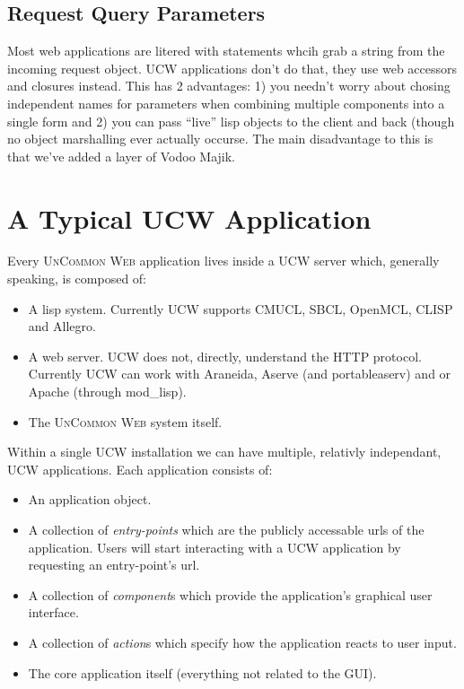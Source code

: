 \documentclass[a4paper]{article}
\newcommand{\ucw}{\textsc{UCW}}
\newcommand{\UCW}{\textsc{UnCommon Web}}
\begin{document}
\subsection{Request Query Parameters}

Most web applications are litered with statements whcih grab a string
from the incoming request object. \ucw{} applications don't do that,
they use web accessors and closures instead. This has 2 advantages: 1)
you needn't worry about chosing independent names for parameters when
combining multiple components into a single form and 2) you can pass
``live'' lisp objects to the client and back (though no object
marshalling ever actually occurse. The main disadvantage to this is
that we've added a layer of Vodoo Majik.

\section{A Typical UCW Application}

Every \UCW{} application lives inside a \ucw{} server which, generally
speaking, is composed of:

\begin{itemize}
\item A lisp system. Currently \ucw{} supports CMUCL, SBCL, OpenMCL,
  CLISP and Allegro.
\item A web server. \ucw{} does not, directly, understand the HTTP
  protocol. Currently \ucw{} can work with Araneida, Aserve (and
  portableaserv) and or Apache (through mod\_lisp).
\item The \UCW{} system itself.
\end{itemize}

Within a single \ucw{} installation we can have multiple, relativly
independant, \ucw{} applications. Each application consists of:

\begin{itemize}
\item An application object.
\item A collection of \textit{entry-points} which are the publicly
  accessable urls of the application. Users will start interacting
  with a \ucw{} application by requesting an entry-point's url.
\item A collection of \textit{component}s which provide the application's
  graphical user interface.
\item A collection of \textit{action}s which specify how the
  application reacts to user input.
\item The core application itself (everything not related to the GUI).
\end{itemize}
\end{document}
